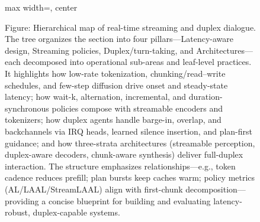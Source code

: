 \begin{figure}[h]
\begin{adjustbox}{max width=\textwidth, center}
\end{adjustbox}

\caption{Figure: Hierarchical map of real-time streaming and duplex dialogue. The tree organizes the section into four pillars—Latency-aware design, Streaming policies, Duplex/turn-taking, and Architectures—each decomposed into operational sub-areas and leaf-level practices. It highlights how low-rate tokenization, chunking/read–write schedules, and few-step diffusion drive onset and steady-state latency; how wait-k, alternation, incremental, and duration-synchronous policies compose with streamable encoders and tokenizers; how duplex agents handle barge-in, overlap, and backchannels via IRQ heads, learned silence insertion, and plan-first guidance; and how three-strata architectures (streamable perception, duplex-aware decoders, chunk-aware synthesis) deliver full-duplex interaction. The structure emphasizes relationships—e.g., token cadence reduces prefill; plan bursts keep caches warm; policy metrics (AL/LAAL/StreamLAAL) align with first-chunk decomposition—providing a concise blueprint for building and evaluating latency-robust, duplex-capable systems.}
\label{fig:tree_figure_Real }

\end{figure}